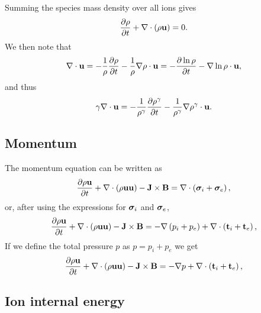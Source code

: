 \documentclass[a4paper,11pt]{report}
\begin{document}
Summing the species mass density over all ions gives
\begin{equation}
    \frac{\partial \rho}{\partial t} + \nabla \cdot \left( \rho \mathbf{u} \right) = 0.
\end{equation}
We then note that
\begin{equation*}
    \nabla \cdot \mathbf{u} = -\frac{1}{\rho} \frac{\partial \rho}{\partial t} - \frac{1}{\rho} \nabla \rho \cdot \mathbf{u} = - \frac{\partial \ln{\rho} }{\partial t} -  \nabla \ln{\rho} \cdot \mathbf{u},
\end{equation*}
and thus
\begin{equation}
    \label{eq:mhd_div_trick}
    \gamma \nabla \cdot \mathbf{u} = -\frac{1}{\rho^\gamma} \frac{\partial \rho^\gamma}{\partial t} - \frac{1}{\rho^\gamma} \nabla \rho^\gamma \cdot \mathbf{u}.
\end{equation}

\subsection{Momentum}

The momentum equation can be written as
\begin{equation*}
    \frac{\partial \rho \mathbf{u}}{\partial t} + \nabla \cdot \left( \rho \mathbf{u} \mathbf{u} \right) - \mathbf{J} \times \mathbf{B} = \nabla \cdot \left(  \bm \sigma_i + \bm \sigma_e \right),
\end{equation*}
or, after using the expressions for $\bm \sigma_i$ and $\bm \sigma_e$,
\begin{equation*}
    \frac{\partial \rho \mathbf{u}}{\partial t} + \nabla \cdot \left( \rho \mathbf{u} \mathbf{u} \right) - \mathbf{J} \times \mathbf{B} = -\nabla \left(  p_i + p_e \right) + \nabla \cdot \left(  \mathbf{t}_i + \mathbf{t}_e \right),
\end{equation*}
If we define the total pressure $p$ as $p = p_i + p_e$ we get
\begin{equation*}
    \frac{\partial \rho \mathbf{u}}{\partial t} + \nabla \cdot \left( \rho \mathbf{u} \mathbf{u} \right) - \mathbf{J} \times \mathbf{B} = -\nabla p + \nabla \cdot \left(  \mathbf{t}_i + \mathbf{t}_e \right),
\end{equation*}

\subsection{Ion internal energy}
\end{document}
